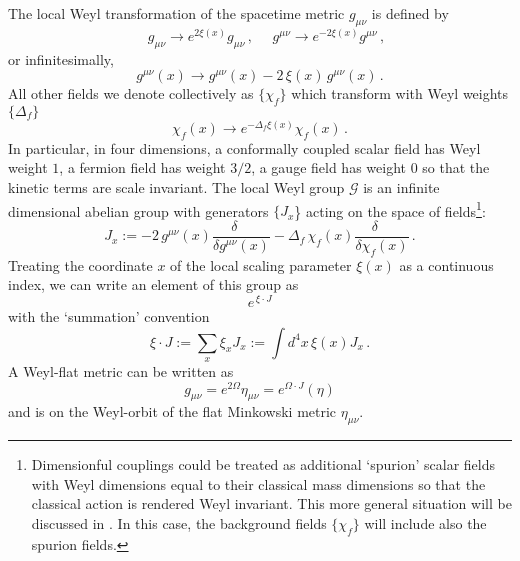 \documentclass[12pt,a4paper]{article}
\newcommand{\be}{\begin{equation}}
\newcommand{\ee}{\end{equation}}
\renewcommand{\d}{\delta}
\newcommand{\m}{\mu}
\newcommand{\n}{\nu}
\renewcommand{\O}{\Omega}
\newcommand{\1}{{\textbf{1}}}
\newcommand{\+}{{\,+ \,}}
\begin{document}
The  local Weyl transformation of the spacetime metric $g_{\m\n}$ is defined by
\be
\quad g_{\m\n} \rightarrow e^{2 \xi (x)} g_{\m\n} \, , \quad \,\, g^{\m\n} 
\rightarrow e^{-2 \xi (x)} g^{\m\n} \, , 
\ee
or infinitesimally,
\be
g^{\m\n}(x) \rightarrow  g^{\m\n}(x) - {2\,\xi (x)}\, g^{\m\n}(x) \,  .
\ee
All other  fields we denote collectively as $\{\chi_{f}\}$ which  transform with Weyl weights $\{\Delta_{f}\}$
\be
\chi_{f}(x) \rightarrow e^{-\Delta_{f }\xi(x) }\chi_{f}(x)  \, .
\ee
In particular,  in four dimensions, a conformally coupled  scalar field has Weyl weight $1$, a fermion field has weight $3/2$, a gauge field has weight $0$ so that the kinetic terms are scale invariant. 
The local Weyl group $\mathcal{G}$ is an infinite dimensional  abelian group with generators $\{J_x$\} acting on the space of fields\footnote{Dimensionful couplings  could be treated as additional `spurion’ scalar fields with Weyl dimensions  equal to their classical mass dimensions so that the classical action is rendered Weyl invariant. This more general situation will be discussed in \cite{Benevides:2017a}. In this case, the background fields $\{\chi_{f}\}$ will include also the spurion fields.}:
\be
J_x :=  -2 \, g^{\mu\nu}(x)\frac{\delta\quad}{\d g^{\m\n}(x)} - \Delta_{f}\, \chi_{f}(x)\frac{\d\quad }{\d \chi_{f}(x)}  \, . 
\ee
Treating the coordinate $x$ of the local scaling parameter $\xi(x)$ as a continuous index,  we can write an element  of this group as
\be
e^{\,\xi \cdot J} 
\ee
with the `summation' convention
\be
\xi \cdot J :=  \sum_x  \xi_x J_x := \int d^4x \,  \xi (x) J_x \, .
\ee
A Weyl-flat metric can be written as
\be\label{weyl-flat}
g_{\m\n} = e^{2\Omega} \eta_{\m \n} = e^{\O \cdot  J} (\eta)
\ee
and is on the Weyl-orbit of the flat Minkowski metric $\eta_{\m\n}$.
\end{document}
